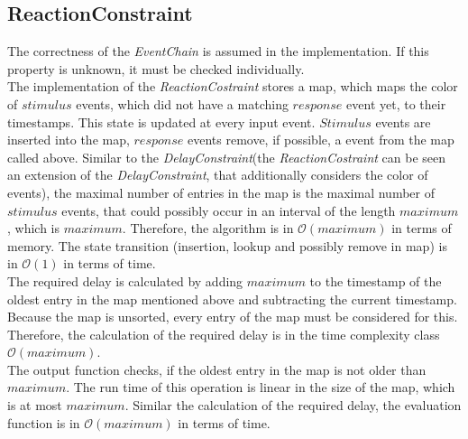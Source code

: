 \subsection{ReactionConstraint}
	The correctness of the \textit{EventChain} is assumed in the implementation. If this property is unknown, it must be checked individually.\\
	The implementation of the \emph{ReactionCostraint} stores a map, which maps the color of $stimulus$ events, which did not have a matching $response$ event yet, to their timestamps. This state is updated at every input event. $Stimulus$ events are inserted into the map, $response$ events remove, if possible, a event from the map called above. Similar to the \emph{DelayConstraint}(the \emph{ReactionCostraint} can be seen an extension of the \emph{DelayConstraint}, that additionally considers the color of events), the maximal number of entries in the map is the maximal number of $stimulus$ events, that could possibly occur in an interval of the length $maximum$, which is $maximum$.  Therefore, the algorithm is in $\mathcal{O}(maximum)$ in terms of memory. The state transition (insertion, lookup and possibly remove in map) is in $\mathcal{O}(1)$ in terms of time.\\
	The required delay is calculated by adding $maximum$ to the timestamp of the oldest entry in the map mentioned above and subtracting the current timestamp. Because the map is unsorted, every entry of the map must be considered for this. Therefore, the calculation of the required delay is in the time complexity class $\mathcal{O}(maximum)$.\\
	The output function checks, if the oldest entry in the map is not older than $maximum$. The run time of this operation is linear in the size of the map, which is at most $maximum$. Similar the calculation of the required delay, the evaluation function is in $\mathcal{O}(maximum)$ in terms of time.
	
